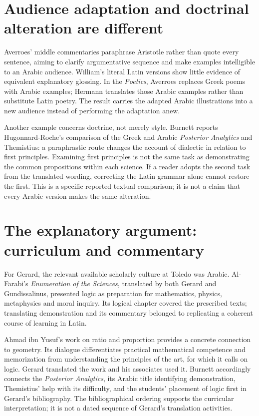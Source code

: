 \section{Audience adaptation and doctrinal alteration are different}
\label{sec:p13-burnett-2004-audience-doctrine}

Averroes' middle commentaries paraphrase Aristotle rather than
quote every sentence, aiming to clarify argumentative sequence
and make examples intelligible to an Arabic audience. William's
literal Latin versions show little evidence of equivalent
explanatory glossing. In the \emph{Poetics}, Averroes replaces
Greek poems with Arabic examples; Hermann translates those
Arabic examples rather than substitute Latin poetry. The
result carries the adapted Arabic illustrations into a new
audience instead of performing the adaptation anew.
\cite[pp.~603--604, notes~18--19]{Burnett2004ArabicLatinHHL}

Another example concerns doctrine, not merely style. Burnett
reports Hugonnard-Roche's comparison of the Greek and Arabic
\emph{Posterior Analytics} and Themistius: a paraphrastic route
changes the account of dialectic in relation to first principles.
Examining first principles is not the same task as demonstrating
the common propositions within each science. If a reader
adopts the second task from the translated wording, correcting
the Latin grammar alone cannot restore the first. This is a
specific reported textual comparison; it is not a claim that
every Arabic version makes the same alteration.
\cite[p.~604, note~20]{Burnett2004ArabicLatinHHL}

\section{The explanatory argument: curriculum and commentary}
\label{sec:p13-burnett-2004-explanation}

For Gerard, the relevant available scholarly culture at Toledo
was Arabic. Al-Farabi's \emph{Enumeration of the Sciences},
translated by both Gerard and Gundissalinus, presented logic
as preparation for mathematics, physics, metaphysics and
moral inquiry. Its logical chapter covered the prescribed
texts; translating demonstration and its commentary belonged
to replicating a coherent course of learning in Latin.
\cite[pp.~604--605]{Burnett2004ArabicLatinHHL}

Ahmad ibn Yusuf's work on ratio and proportion provides
a concrete connection to geometry. Its dialogue differentiates
practical mathematical competence and memorization from
understanding the principles of the art, for which it calls
on logic. Gerard translated the work and his associates used
it. Burnett accordingly connects the \emph{Posterior Analytics},
its Arabic title identifying demonstration, Themistius' help
with its difficulty, and the students' placement of logic
first in Gerard's bibliography. The bibliographical ordering
supports the curricular interpretation; it is not a dated
sequence of Gerard's translation activities.
\cite[pp.~604--605, notes~21--23]{Burnett2004ArabicLatinHHL}

